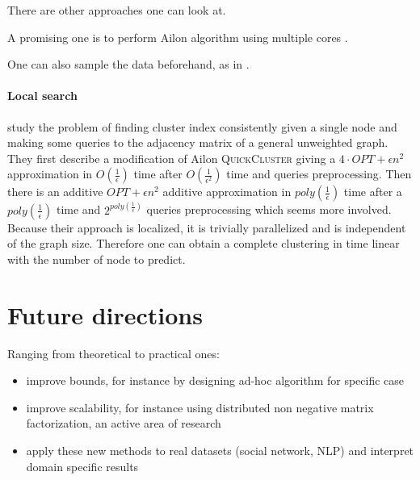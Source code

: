 There are other approaches \autocite[Part III]{bonchi2014correlation} one can
look at.

A promising one is to perform Ailon algorithm using multiple cores
\autocite{Pan2014}.

One can also sample the data beforehand, as in \autocite{Bertolacci07}.

\paragraph{Local search}
\Textcite{Bonchi2013} study the problem of finding cluster index consistently
given a single node and making some queries to the adjacency matrix of a
general unweighted graph. They first describe a modification of Ailon
\textsc{QuickCluster} giving a $4\cdot OPT + \epsilon n^2$ approximation in
$O(\frac{1}{\epsilon})$ time after $O(\frac{1}{\epsilon^2})$ time and queries
preprocessing. Then there is an additive $OPT + \epsilon n^2$ additive
approximation in $poly(\frac{1}{\epsilon})$ time after a
$poly(\frac{1}{\epsilon})$ time and $2^{poly(\frac{1}{\epsilon})}$ queries
preprocessing which seems more involved.  Because their approach is localized,
it is trivially parallelized and is independent of the graph size. Therefore
one can obtain a complete clustering in time linear with the number of node to
predict.
\section{Future directions}
Ranging from theoretical to practical ones:

\begin{itemize}
	\item improve bounds, for instance by designing ad-hoc algorithm for
		specific case
	\item improve scalability, for instance using distributed non negative
		matrix factorization, an active area of research
		\autocite{Bhojanapalli2014,Hastie2014,Udell2014}
	\item apply these new methods to real datasets (social network, NLP) and
		interpret domain specific results
\end{itemize}
